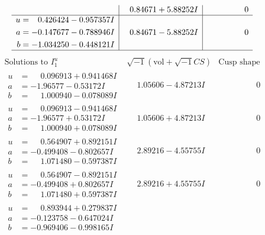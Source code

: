 \documentclass[1p]{elsarticle_modified}
\theoremstyle{definition}
\newcommand{\I}{\sqrt{-1}}
\begin{document}
$$\begin{array}{c|c|c}
 & \phantom{-}0.84671 + 5.88252 I & \phantom{-0.000000 } 0 \\ \hline\begin{aligned}
u &= \phantom{-}0.426424 - 0.957357 I \\
a &= -0.147677 - 0.788946 I \\
b &= -1.034250 - 0.448121 I\end{aligned}
 & \phantom{-}0.84671 - 5.88252 I & \phantom{-0.000000 } 0\\
 \hline 
 \end{array}$$\newpage$$\begin{array}{c|c|c}  
\text{Solutions to }I^u_{1}& \I (\text{vol} + \sqrt{-1}CS) & \text{Cusp shape}\\
 \hline 
\begin{aligned}
u &= \phantom{-}0.096913 + 0.941468 I \\
a &= -1.96577 - 0.53172 I \\
b &= \phantom{-}1.000940 - 0.078089 I\end{aligned}
 & \phantom{-}1.05606 - 4.87213 I & \phantom{-0.000000 } 0 \\ \hline\begin{aligned}
u &= \phantom{-}0.096913 - 0.941468 I \\
a &= -1.96577 + 0.53172 I \\
b &= \phantom{-}1.000940 + 0.078089 I\end{aligned}
 & \phantom{-}1.05606 + 4.87213 I & \phantom{-0.000000 } 0 \\ \hline\begin{aligned}
u &= \phantom{-}0.564907 + 0.892151 I \\
a &= -0.499408 - 0.802657 I \\
b &= \phantom{-}1.071480 - 0.597387 I\end{aligned}
 & \phantom{-}2.89216 - 4.55755 I & \phantom{-0.000000 } 0 \\ \hline\begin{aligned}
u &= \phantom{-}0.564907 - 0.892151 I \\
a &= -0.499408 + 0.802657 I \\
b &= \phantom{-}1.071480 + 0.597387 I\end{aligned}
 & \phantom{-}2.89216 + 4.55755 I & \phantom{-0.000000 } 0 \\ \hline\begin{aligned}
u &= \phantom{-}0.893944 + 0.279837 I \\
a &= -0.123758 - 0.647024 I \\
b &= -0.969406 - 0.998165 I\end{aligned}

\end{array}$$
\end{document}
